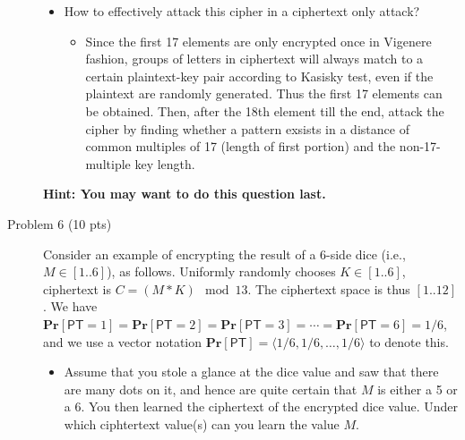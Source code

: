 \documentclass[11pt]{article}
\renewcommand{\Pr}{\ensuremath{\mathbf{Pr}}\xspace}
\newcommand{\tuple}[1]{\ensuremath{\langle #1 \rangle}\xspace}
\newcommand{\PT}{\ensuremath{\mathsf{PT}}\xspace}
\begin{document}
\begin{description}
\begin{itemize}
 \item
How to effectively attack this cipher in a ciphertext only attack?
	\begin{itemize}
	\item 
	Since the first 17 elements are only encrypted once in Vigenere fashion, groups of letters in ciphertext will always match to a certain plaintext-key pair according to Kasisky test, even if the plaintext are randomly generated. Thus the first 17 elements can be obtained. Then, after the 18th element till the end, attack the cipher by finding whether a pattern exsists in a distance of common multiples of 17 (length of first portion) and the non-17-multiple key length.
	\end{itemize}
\end{itemize}
\textbf{Hint: You may want to do this question last. }\\

 \item[Problem 6 (10 pts)]
Consider an example of encrypting the result of a 6-side dice (i.e., $M \in [1..6]$), as follows.
Uniformly randomly chooses $K \in [1..6]$, ciphertext is $C= (M*K) \mod 13$.  The ciphertext space is thus $[1..12]$.
We have $\Pr[\PT=1]=\Pr[\PT=2]=\Pr[\PT=3]=\cdots=\Pr[\PT=6]=1/6$, and we use a vector notation $\Pr[\PT]=\tuple{1/6,1/6,\ldots,1/6}$ to denote this.

\begin{itemize}
 \item
Assume that you stole a glance at the dice value and saw that there are many dots on it, and hence are quite certain that
$M$ is either a 5 or a 6.  You then learned the ciphertext of the encrypted dice value.  Under which ciphtertext value(s)
can you learn the value $M$.


\end{itemize}
\end{description}
\end{document}
